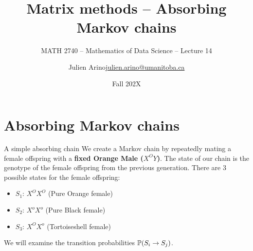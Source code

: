 \documentclass[aspectratio=169]{beamer}\usepackage[]{graphicx}\usepackage[]{xcolor}
\subtitle{MATH 2740 -- Mathematics of Data Science -- Lecture 14}
\author{\texorpdfstring{Julien Arino\newline\url{julien.arino@umanitoba.ca}}{Julien Arino}}
\institute{Department of Mathematics @ University of Manitoba}
\date{Fall 202X}
\title{Matrix methods -- Absorbing Markov chains}
\begin{document}


\section{Absorbing Markov chains}

\begin{frame}{A simple absorbing chain}
    We create a Markov chain by repeatedly mating a female offspring with a \textbf{fixed Orange Male ($X^O Y$)}.
    \vfill
    The state of our chain is the genotype of the female offspring from the previous generation.
    \vfill
    There are 3 possible states for the female offspring:
    \begin{itemize}
        \item $S_1$: $X^O X^O$ (Pure Orange female)
        \item $S_2$: $X^o X^o$ (Pure Black female)
        \item $S_3$: $X^O X^o$ (Tortoiseshell female)
    \end{itemize}
    \vfill
    We will examine the transition probabilities $\mathbb{P}(S_i \to S_j)$.
\end{frame}
\end{document}
